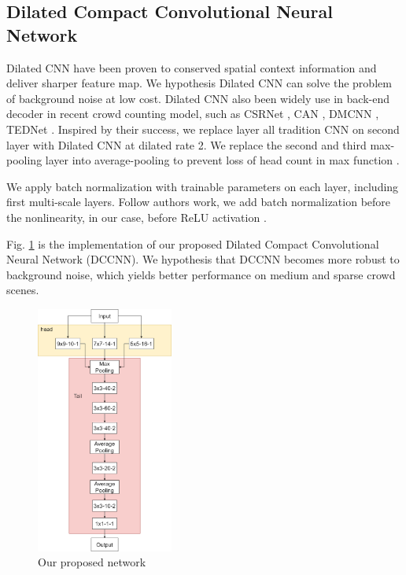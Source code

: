 \subsection{Dilated Compact Convolutional Neural Network}


Dilated CNN have been proven to conserved spatial context information \cite{li2018csrnet} and deliver sharper feature map. We hypothesis Dilated CNN can solve the problem of background noise at low cost. Dilated CNN also been widely use in back-end decoder in recent crowd counting model, such as CSRNet \cite{li2018csrnet}, CAN \cite{liu2019context}, DMCNN \cite{zhang2019crowd}, TEDNet \cite{jiang2019crowd}. Inspired by their success, we replace layer all tradition CNN on second layer with Dilated CNN at dilated rate 2. We replace the second and third max-pooling layer into average-pooling to prevent loss of head count in max function \cite{zhang2019crowd}. 

We apply batch normalization \cite{ioffe2015batch} with trainable parameters on each layer, including first multi-scale layers. Follow authors work, we add batch normalization before the nonlinearity, in our case, before ReLU activation \cite{agarap2018deep}. 

Fig. \ref{fig:dccnn} is the implementation of our proposed Dilated Compact Convolutional Neural Network (DCCNN).  We hypothesis that DCCNN becomes more robust to background noise, which yields better performance on medium and sparse crowd scenes. 



\begin{figure}[htbp]
\centerline{\includegraphics[width=0.4\textwidth]{Picture/proposed/tail13_fix2.png}}
\caption{Our proposed network}
\label{fig:dccnn}
\end{figure}




